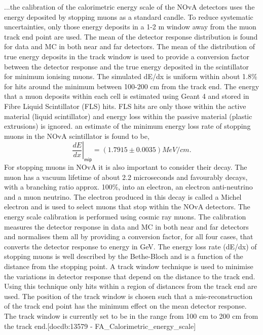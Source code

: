 \documentclass[12pt,a4paper]{article}
\begin{document}
...the calibration of the calorimetric energy scale of the NOvA detectors uses the energy deposited by stopping muons as a standard candle. To reduce systematic uncertainties, only those energy deposits in a 1-2 m window away from the muon track end point are used. The mean of the detector response distribution is found for data and MC in both near and far detectors. The mean of the distribution of true energy deposits in the track window is used to provide a conversion factor between the detector response and the true energy deposited in the scintillator for minimum ionising muons. The simulated dE/dx is uniform within about 1.8\% for hits around the minimum between 100-200 cm from the track end. The energy that a muon deposits within each cell is estimated using Geant 4 and stored in Fibre Liquid Scintillator (FLS) hits. FLS hits are only those within the active material (liquid scintillator) and energy loss within the passive material (plastic extrusions) is ignored. an estimate of the minimum energy loss rate of stopping muons in the NOvA scintillator is found to be,
\begin{equation}
\left.\frac{dE}{dx}\right|_{\textsf{mip}}=\left(1.7915\pm 0.0035\right)\unit{MeV/cm}.
\end{equation}
For stopping muons in NOvA it is also important to consider their decay. The muon has a vacuum lifetime of about 2.2 microseconds and favourably decays, with a branching ratio approx. 100\%, into an electron, an electron anti-neutrino and a muon neutrino. The electron produced in this decay is called a Michel electron and is used to select muons that stop within the NOvA detectors. The energy scale calibration is performed using cosmic ray muons. The calibration measures the detector response in data and MC in both near and far detectors and normalises them all by providing a conversion factor, for all four cases, that converts the detector response to energy in GeV. The energy loss rate (dE/dx) of stopping muons is well described by the Bethe-Bloch and is a function of the distance from the stopping point. A track window technique is used to minimise the variations in detector response that depend on the distance to the track end. Using this technique only hits within a region of distances from the track end are used. The position of the track window is chosen such that a mis-reconstruction of the track end point has the minimum effect on the mean detector response. The track window is currently set to be in the range from 100 cm to 200 cm from the track end.[docdb:13579 - FA\_Calorimetric\_energy\_scale]
\end{document}
